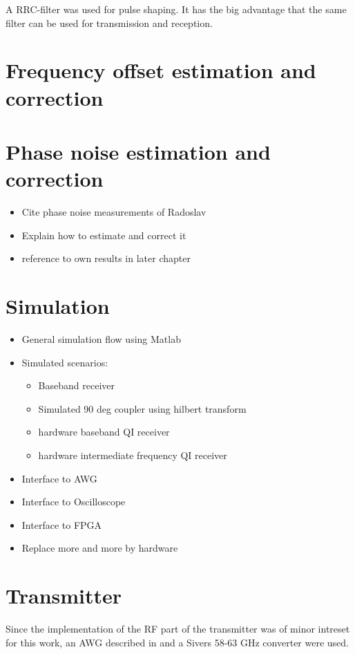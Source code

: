A \gls{RRC}-filter was used for pulse shaping. It has the big advantage that
the same filter can be used for transmission and reception. \\


\section{Frequency offset estimation and correction}

\section{Phase noise estimation and correction}
\begin{itemize}
\item Cite phase noise measurements of Radoslav
\item Explain how to estimate and correct it
\item reference to own results in later chapter
\end{itemize}

\section{Simulation}
\begin{itemize}
\item General simulation flow using Matlab
\item Simulated scenarios:
  \begin{itemize}
  \item Baseband receiver
  \item Simulated 90 deg coupler using hilbert transform
  \item hardware baseband QI receiver
  \item hardware intermediate frequency QI receiver
  \end{itemize}
\item Interface to AWG
\item Interface to Oscilloscope
\item Interface to FPGA
\item Replace more and more by hardware
\end{itemize}


\section{Transmitter}
Since the implementation of the \gls{RF} part of the
transmitter was of minor intreset for this work,
an \gls{AWG} described in 
and a Sivers 58-63 GHz converter were used. \\
